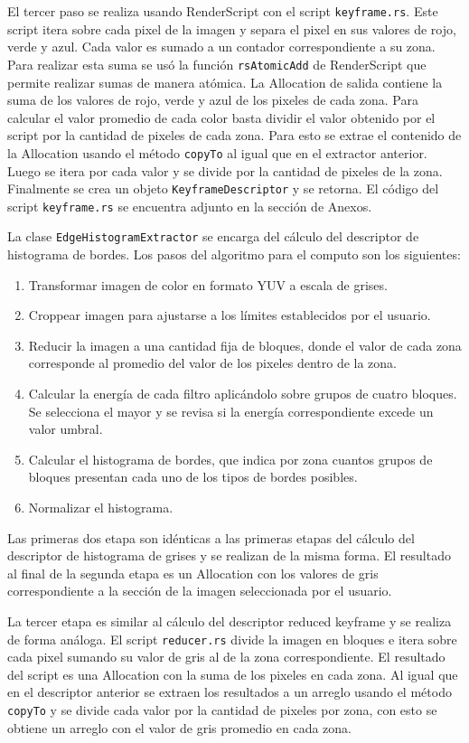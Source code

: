 El tercer paso se realiza usando RenderScript con el script \texttt{keyframe.rs}. Este script itera sobre cada pixel de la imagen y separa el pixel en sus valores de rojo, verde y azul. Cada valor es sumado a un contador correspondiente a su zona. Para realizar esta suma se usó la función \texttt{rsAtomicAdd} de RenderScript que permite realizar sumas de manera atómica. La Allocation de salida contiene la suma de los valores de rojo, verde y azul de los pixeles de cada zona. Para calcular el valor promedio de cada color basta dividir el valor obtenido por el script por la cantidad de pixeles de cada zona. Para esto se extrae el contenido de la Allocation usando el método \texttt{copyTo} al igual que en el extractor anterior. Luego se itera por cada valor y se divide por la cantidad de pixeles de la zona. Finalmente se crea un objeto \texttt{KeyframeDescriptor} y se retorna. El código del script \texttt{keyframe.rs} se encuentra adjunto en la sección de Anexos.
 
La clase \texttt{EdgeHistogramExtractor} se encarga del cálculo del descriptor de histograma de bordes. Los pasos del algoritmo para el computo son los siguientes:
\begin{enumerate}
\item Transformar imagen de color en formato YUV a escala de grises.
\item Croppear imagen para ajustarse a los límites establecidos por el usuario.
\item Reducir la imagen a una cantidad fija de bloques, donde el valor de cada zona corresponde al promedio del valor de los pixeles dentro de la zona.
\item Calcular la energía de cada filtro aplicándolo sobre grupos de cuatro bloques. Se selecciona el mayor y se revisa si la energía correspondiente excede un valor umbral.
\item Calcular el histograma de bordes, que indica por zona cuantos grupos de bloques presentan cada uno de los tipos de bordes posibles.
\item Normalizar el histograma.
\end{enumerate}

Las primeras dos etapa son idénticas a las primeras etapas del cálculo del descriptor de histograma de grises y se realizan de la misma forma. El resultado al final de la segunda etapa es un Allocation con los valores de gris correspondiente a la sección de la imagen seleccionada por el usuario.

La tercer etapa es similar al cálculo del descriptor reduced keyframe y se realiza de forma análoga. El script \texttt{reducer.rs} divide la imagen en bloques e itera sobre cada pixel sumando su valor de gris al de la zona correspondiente. El resultado del script es una Allocation con la suma de los pixeles en cada zona. Al igual que en el descriptor anterior se extraen los resultados a un arreglo usando el método \texttt{copyTo} y se divide cada valor por la cantidad de pixeles por zona, con esto se obtiene un arreglo con el valor de gris promedio en cada zona.

